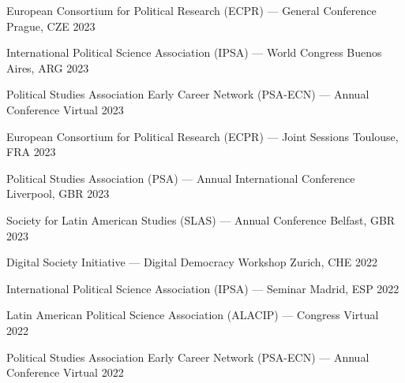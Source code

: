 \begin{cvhonors}
\cvconf
{European Consortium for Political Research (ECPR) --- General Conference} 
{Prague, CZE}
{2023}
\end{cvhonors}

\begin{cvhonors}
\cvconf
{International Political Science Association (IPSA) --- World Congress} 
{Buenos Aires, ARG}
{2023}
\end{cvhonors}

\begin{cvhonors}
\cvconf
{Political Studies Association Early Career Network (PSA-ECN) --- Annual Conference} 
{Virtual}
 {2023}
\end{cvhonors}


\begin{cvhonors}
\cvconf
{European Consortium for Political Research (ECPR) --- Joint Sessions} 
{Toulouse, FRA}
{2023}
\end{cvhonors}

\begin{cvhonors}
\cvconf
{Political Studies Association (PSA) --- Annual International Conference} 
{Liverpool, GBR}
{2023}
\end{cvhonors}

\begin{cvhonors}
\cvconf
{Society for Latin American Studies (SLAS) --- Annual Conference} 
{Belfast, GBR}
{2023}
\end{cvhonors}


\begin{cvhonors}
\cvconf
{Digital Society Initiative --- Digital Democracy Workshop} 
{Zurich, CHE}
{2022}
\end{cvhonors}

\begin{cvhonors}
\cvconf
{International Political Science Association (IPSA) --- Seminar} 
{Madrid, ESP}
{2022}
\end{cvhonors}

\begin{cvhonors}
\cvconf
{Latin American Political Science Association (ALACIP) --- Congress} 
{Virtual}
{2022}
\end{cvhonors}

\begin{cvhonors}
\cvconf
{Political Studies Association Early Career Network (PSA-ECN) --- Annual Conference} 
{Virtual}
{2022}
\end{cvhonors}

